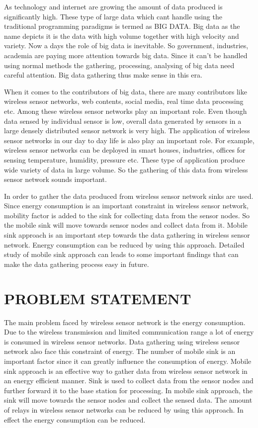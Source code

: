 \documentclass[MTech]{iitmdiss}
\begin{document}
 As technology and internet are growing the amount of data produced is significantly high. These type of large data which cant handle using the traditional programming paradigms is termed as BIG DATA. Big data as the name depicts it is the data with high volume together with high velocity and variety. Now a days the role of big data is inevitable. So government, industries, academia are paying more attention towards big data. Since it can't be handled using normal methods the gathering, processing, analysing of big data need careful attention. Big data gathering thus make sense in this era.


	When it comes to the contributors of big data, there are many contributors like wireless sensor networks, web contents, social media, real time data processing etc. Among these wireless sensor networks play an important role. Even though data sensed by individual sensor is low, overall data generated by sensors in a large densely distributed  sensor network is very high. The application of  wireless sensor networks in our day to day life is also play an important role. For example, wireless sensor networks can be deployed in smart houses, industries, offices for sensing temperature,  humidity, pressure etc. These type of application produce wide variety of data in large volume. So the gathering of this data from wireless sensor network sounds important.
	
	
	In order to gather the data produced from wireless sensor network sinks are used. Since energy consumption is an important constraint in wireless sensor network, mobility factor is added to  the sink for collecting data from the sensor nodes. So the mobile sink will move towards sensor nodes and collect data from it. Mobile sink approach is an important step towards the data gathering in wireless sensor network. Energy consumption can be reduced by using this approach. Detailed study of mobile sink approach can leads to some important findings that can make the data gathering process easy in future.

\pagebreak
\chapter{PROBLEM STATEMENT}
\label{chap:problem}
 The main problem faced by wireless sensor network is the energy consumption. Due to the wireless transmission and limited communication range a lot of energy is consumed in wireless sensor networks. Data gathering using wireless sensor network also face this constraint of energy. The number of mobile sink is an important factor since it can greatly influence the consumption of energy. Mobile sink approach is an effective way to gather data from wireless sensor network in an energy efficient manner. Sink is used to collect data from the sensor nodes and further forward it to the base station for processing. In mobile sink approach, the sink will move towards the sensor nodes and collect the sensed data. The amount of relays in wireless sensor networks can be reduced by using this approach. In effect the energy consumption can be reduced.
 
\end{document}
